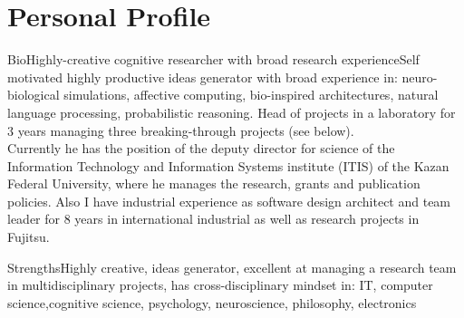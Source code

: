\documentclass{moderncv}
\begin{document}

\makecvtitle

 
\section{Personal Profile}

\cventry
    {Bio}{Highly-creative cognitive researcher with broad research experience}{}{}{}{Self motivated highly productive ideas generator with broad experience in: neuro-biological simulations, affective computing, bio-inspired architectures, natural language processing, probabilistic reasoning. Head of projects in a laboratory for 3 years managing three breaking-through projects (see below).\\
      Currently he has the position of the deputy director for science of the Information Technology and Information Systems institute (ITIS) of the Kazan Federal University, where he manages the research, grants and publication policies. Also I have industrial experience as software design architect and team leader for 8 years in international industrial as well as research projects in Fujitsu.}

\cvitem
{Strengths}{Highly creative, ideas generator, excellent at managing a research team in multidisciplinary projects, has cross-disciplinary mindset in: IT, computer science,cognitive science, psychology, neuroscience, philosophy, electronics}
\end{document}
